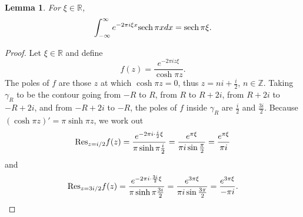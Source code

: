\documentclass{article}
\newcommand{\Res}{\ensuremath\mathrm{Res}}
\newcommand{\sech}{\ensuremath\mathrm{sech}\,}
\newtheorem{lemma}[theorem]{Lemma}
\theoremstyle{definition}
\begin{document}
\begin{lemma}
For $\xi \in \mathbb{R}$,
\[
\int_{-\infty}^\infty e^{-2\pi i\xi x} \sech \pi x dx = \sech \pi \xi.
\]
\end{lemma}
\begin{proof}
Let $\xi \in \mathbb{R}$ and define
\[
f(z)=\frac{e^{-2\pi iz\xi}}{\cosh \pi z}.
\]
The poles of $f$ are those $z$ at which $\cosh \pi z=0$, thus $z=n i+\frac{i}{2}$, $n \in \mathbb{Z}$.  
Taking $\gamma_R$ to be the contour going from $-R$ to $R$, from $R$ to $R+2i$, from $R+2i$ to $-R+2i$, and from
$-R+2i$ to $-R$, the poles of $f$ inside $\gamma_R$ are $\frac{i}{2}$ and $\frac{3i}{2}$. 
Because $(\cosh \pi z)'=\pi \sinh \pi z$, we work out
\[
\Res_{z=i/2} f(z) = \frac{e^{-2\pi i \cdot \frac{i}{2} \xi}}{\pi \sinh \pi \frac{i}{2}}
=\frac{e^{\pi \xi}}{\pi i \sin \frac{\pi}{2}}
=\frac{e^{\pi \xi}}{\pi i}
\]
and
\[
\Res_{z=3i/2} f(z) = \frac{e^{-2\pi i\cdot \frac{3i}{2} \xi}}{\pi \sinh \pi \frac{3i}{2}}
=\frac{e^{3\pi \xi}}{\pi i \sin \frac{3\pi}{2}}
=\frac{e^{3\pi \xi}}{-\pi i}.
\]


\end{proof}
\end{document}
